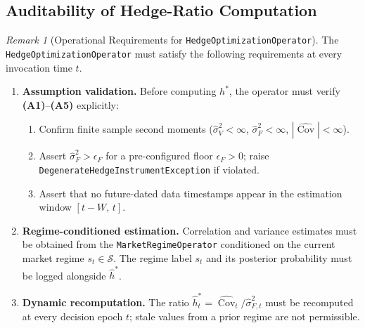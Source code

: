 \documentclass[12pt,openany]{book}
\numberwithin{equation}{chapter}
\theoremstyle{plain}
\theoremstyle{definition}
\theoremstyle{remark}
\newtheorem{remark}[theorem]{Remark}
\numberwithin{equation}{chapter}
\theoremstyle{plain}
\DeclareMathOperator{\Cov}{Cov}
\begin{document}
\subsection{Auditability of Hedge-Ratio Computation}
\label{ssec:hedge-audit}

\begin{remark}[Operational Requirements for \texttt{HedgeOptimizationOperator}]
\label{rem:hedge-operator}
The \texttt{HedgeOptimizationOperator} must satisfy the following
requirements at every invocation time $t$.
\begin{enumerate}
  \item \textbf{Assumption validation.}
        Before computing $h^*$, the operator must verify
        \textbf{(A1)}--\textbf{(A5)} explicitly:
        \begin{enumerate}
          \item Confirm finite sample second moments
                ($\hat\sigma_V^2 < \infty$, $\hat\sigma_F^2 < \infty$,
                $|\widehat{\Cov}| < \infty$).
          \item Assert $\hat\sigma_F^2 > \epsilon_F$ for a
                pre-configured floor $\epsilon_F > 0$; raise
                \texttt{DegenerateHedgeInstrumentException} if violated.
          \item Assert that no future-dated data timestamps appear in
                the estimation window $[t-W,\,t]$.
        \end{enumerate}

  \item \textbf{Regime-conditioned estimation.}
        Correlation and variance estimates must be obtained from the
        \texttt{MarketRegimeOperator} conditioned on the current
        market regime $s_t \in \mathcal{S}$.
        The regime label $s_t$ and its posterior probability must be
        logged alongside $\hat{h}^*$.

  \item \textbf{Dynamic recomputation.}
        The ratio $\hat{h}^*_t = \widehat{\Cov}_t / \hat\sigma_{F,t}^2$
        must be recomputed at every decision epoch $t$; stale values
        from a prior regime are not permissible.


\end{enumerate}
\end{remark}
\end{document}
